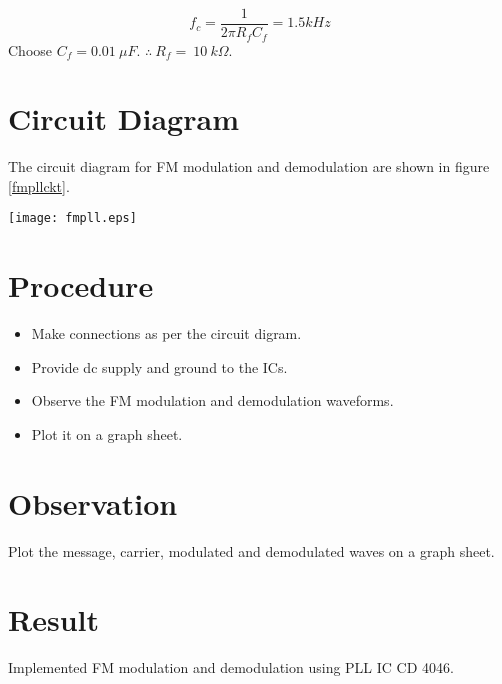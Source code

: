 \begin{equation}
f_c=\frac{1}{2\pi R_fC_f}=1.5kHz
\end{equation}
Choose $C_f=0.01\ \mu F$.  $\therefore \ R_f=\ 10 \ k\Omega$.
\section*{Circuit Diagram}

The circuit diagram for FM modulation and demodulation are shown in figure \ref{fmpllckt}.

\begin{sidewaysfigure}[ht]
    \texttt{[image: fmpll.eps]}
    \caption{Circuit for FM generation and detection using CD4046 PLL IC}
    \label{fmpllckt}
\end{sidewaysfigure}


\section*{Procedure}
\begin{itemize}
\item
Make connections as per the circuit digram.

\item
Provide dc supply and ground to the ICs.

\item
Observe the FM modulation and demodulation waveforms.

\item
Plot it on a graph sheet.
\end{itemize}
\section*{Observation}

Plot the message, carrier, modulated and demodulated waves on a graph sheet.
\section*{Result}
Implemented FM modulation and demodulation using PLL IC CD 4046.